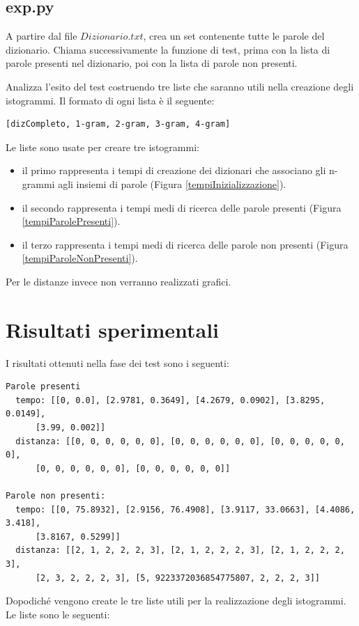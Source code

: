 \documentclass[]{article}
\begin{document}
\subsection*{exp.py}
A partire dal file $Dizionario.txt$, crea un set contenente tutte le parole del dizionario. Chiama successivamente la funzione di test, prima con la lista di parole presenti nel dizionario, poi con la lista di parole non presenti.

Analizza l'esito del test costruendo tre liste che saranno utili nella creazione degli istogrammi. Il formato di ogni lista è il seguente:
\begin{verbatim}
[dizCompleto, 1-gram, 2-gram, 3-gram, 4-gram]
\end{verbatim}

Le liste sono usate per creare tre istogrammi:
\begin{itemize}
\item il primo rappresenta i tempi di creazione dei dizionari che associano gli n-grammi agli insiemi di parole (Figura \ref{tempiInizializzazione}).
\item il secondo rappresenta i tempi medi di ricerca delle parole presenti (Figura \ref{tempiParolePresenti}).
\item il terzo rappresenta i tempi medi di ricerca delle parole non presenti (Figura \ref{tempiParoleNonPresenti}).
\end{itemize}

Per le distanze invece non verranno realizzati grafici.

\section{Risultati sperimentali}

I risultati ottenuti nella fase dei test sono i seguenti:
\begin{verbatim}
Parole presenti
  tempo: [[0, 0.0], [2.9781, 0.3649], [4.2679, 0.0902], [3.8295, 0.0149],
      [3.99, 0.002]]
  distanza: [[0, 0, 0, 0, 0, 0], [0, 0, 0, 0, 0, 0], [0, 0, 0, 0, 0, 0],
      [0, 0, 0, 0, 0, 0], [0, 0, 0, 0, 0, 0]]

Parole non presenti:
  tempo: [[0, 75.8932], [2.9156, 76.4908], [3.9117, 33.0663], [4.4086, 3.418],
      [3.8167, 0.5299]]
  distanza: [[2, 1, 2, 2, 2, 3], [2, 1, 2, 2, 2, 3], [2, 1, 2, 2, 2, 3],
      [2, 3, 2, 2, 2, 3], [5, 9223372036854775807, 2, 2, 2, 3]]
\end{verbatim}

Dopodiché vengono create le tre liste utili per la realizzazione degli istogrammi. Le liste sono le seguenti:
\end{document}
